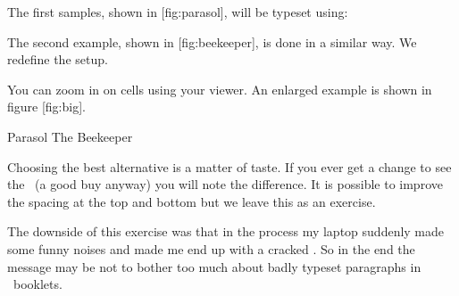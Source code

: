 
\tightlayer[beekeeper]

\stopsetups
\stopbuffer

\getbuffer \typebuffer

\startbuffer[a]
\startsetups [beetext]
  \getbuffer[parasol]
\stopsetups

\definecolor[BeeColor][BeeColorA] \setups[beesample]
\stopbuffer

\startbuffer[b]
\startsetups [beetext]
  \getbuffer[beekeeper]
\stopsetups

\definecolor[BeeColor][BeeColorB] \setups[beesample]
\stopbuffer

\startpostponing

  {\getbuffer[a]}

  {\getbuffer[b]}

\page

\stoppostponing

The first samples, shown in  [fig:parasol], will be typeset using:

\typebuffer[a]

The second example, shown in  [fig:beekeeper], is done in a similar
way. We redefine the  setup.

\typebuffer[b]

You can zoom in on cells using your viewer. An enlarged example is shown in \in
{figure} [fig:big].

\startbuffer
\definecolor[BeeColor][BeeColorC]%
\startcombination
  {}
  {Parasol}
  {}
  {The Beekeeper}
\stopcombination
\stopbuffer

\typebuffer

Choosing the best alternative is a matter of taste. If you ever get a change to
see the \CD\ (a good buy anyway) you will note the difference. It is possible to
improve the spacing at the top and bottom but we leave this as an exercise.

  {\getbuffer}

The downside of this exercise was that in the process my laptop suddenly made
some funny noises and made me end up with a cracked \CD. So in the end the
message may be not to bother too much about badly typeset paragraphs in \CD\
booklets.

